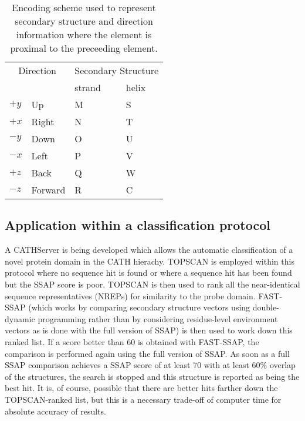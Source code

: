 \documentclass{article}
\begin{document}
\begin{table}
\begin{center}
\begin{tabular}{llll} \hline
\multicolumn{2}{c}{Direction} & \multicolumn{2}{c}{Secondary Structure}\\ \cline{3-4}
          &         & strand & helix  \\ \hline
$+y$      & Up      & M      & S      \\
$+x$      & Right   & N      & T      \\
$-y$      & Down    & O      & U      \\
$-x$      & Left    & P      & V      \\
$+z$      & Back    & Q      & W      \\
$-z$      & Forward & R      & C      \\ \hline
\end{tabular}
\end{center}
\caption{\label{tab:encoding2}Encoding scheme used to represent
          secondary structure and direction information where the
          element is proximal to the preceeding element.}
\end{table}









\subsection{Application within a classification protocol}
A CATHServer is being developed which allows the automatic
classification of a novel protein domain in the CATH hierachy.
TOPSCAN is employed within this protocol where no sequence hit is
found or where a sequence hit has been found but the SSAP score is
poor. TOPSCAN is then used to rank all the near-identical sequence
representatives (NREPs) for similarity to the probe domain. FAST-SSAP
(which works by comparing secondary structure vectors using
double-dynamic programming rather than by considering residue-level
environment vectors as is done with the full version of SSAP) is then
used to work down this ranked list. If a score better than 60 is
obtained with FAST-SSAP, the comparison is performed again using the
full version of SSAP. As soon as a full SSAP comparison achieves a
SSAP score of at least 70 with at least 60\% overlap of the
structures, the search is stopped and this structure is reported as
being the best hit. It is, of course, possible that there are better
hits farther down the TOPSCAN-ranked list, but this is a necessary
trade-off of computer time for absolute accuracy of results.
\end{document}
